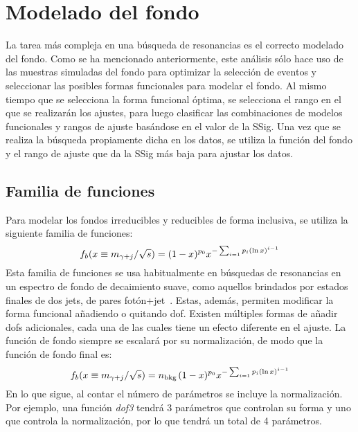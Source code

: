 \section{Modelado del fondo}
\label{sec:bkg:modeling}


La tarea más compleja en una búsqueda de resonancias es el correcto modelado del fondo. Como se ha mencionado anteriormente, este análisis sólo hace uso de las muestras simuladas del fondo para optimizar la selección de eventos y seleccionar las posibles formas funcionales para modelar el fondo. Al mismo tiempo que se selecciona la forma funcional óptima, se selecciona el rango en el que se realizarán los ajustes, para luego clasificar las combinaciones de modelos funcionales y rangos de ajuste basándose en el valor de la \acf{SSig}.
Una vez que se realiza la búsqueda propiamente dicha en los datos, se utiliza la función del fondo y el rango de ajuste que da la \ac{SSig} más baja para ajustar los datos.













\subsection{Familia de funciones}
\label{subsec:bkg:modeling:functions}

Para modelar los fondos irreducibles y reducibles de forma inclusiva, se utiliza la siguiente familia de funciones:
\begin{equation}
    \label{eq:bkg:modeling:functions:general_equation}
    f_{b}( x \equiv m_{\gamma+j} / \sqrt{s}) = (1-x)^{p_0} x^{-\sum_{i=1} p_i \left(\ln x\right)^{i-1}} 
\end{equation}
Esta familia de funciones se usa habitualmente en búsquedas de resonancias en un espectro de fondo de decaimiento suave, como aquellos brindados por estados finales de dos jets, de pares fotón+jet~\cite{ATLAS-Dijet-2019,ATLAS-PhotonJetResonances-2016}. Estas, además, permiten modificar la forma funcional añadiendo o quitando \ac{dof}. Existen múltiples formas de añadir \acp{dof} adicionales, cada una de las cuales tiene un efecto diferente en el ajuste. La función de fondo siempre se escalará por su normalización, de modo que la función de fondo final es:
\begin{equation}
    \label{eq:bkg:modeling:functions:general_equation_normalization}
    f_{b}( x \equiv m_{\gamma+j} / \sqrt{s}) = n_{\text{bkg}\, }(1-x)^{p_0} x^{-\sum_{i=1} p_i \left(\ln x\right)^{i-1}} 
\end{equation}
En lo que sigue, al contar el número de parámetros se incluye la normalización. Por ejemplo, una función \textit{dof3} tendrá 3 parámetros que controlan su forma y uno que controla la normalización, por lo que tendrá un total de 4 parámetros.

